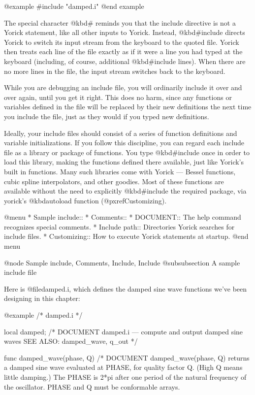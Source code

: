 {@example
#include "damped.i"
@end example

The special character @kbd{#} reminds you that the include directive
is not a Yorick statement, like all other inputs to Yorick.  Instead,
@kbd{#include} directs Yorick to switch its input stream from the
keyboard to the quoted file.  Yorick then treats each line of the file
exactly as if it were a line you had typed at the keyboard (including,
of course, additional @kbd{#include} lines).  When there are no more
lines in the file, the input stream switches back to the keyboard.

While you are debugging an include file, you will ordinarily include
it over and over again, until you get it right.  This does no harm,
since any functions or variables defined in the file will be replaced
by their new definitions the next time you include the file, just as
they would if you typed new definitions.

Ideally, your include files should consist of a series of function
definitions and variable initializations.  If you follow this
discipline, you can regard each include file as a library or package of
functions.  You type @kbd{#include} once in order to load this
library, making the functions defined there available, just like
Yorick's built in functions.  Many such libraries come with Yorick ---
Bessel functions, cubic spline interpolators, and other goodies.
Most of these functions are available without the need to explicitly
@kbd{#include} the required package, via yorick's @kbd{autoload}
function (@pxref{Customizing}).

@menu
* Sample include::              
* Comments::                    
* DOCUMENT::                    The help command recognizes special comments.
* Include path::                Directories Yorick searches for include files.
* Customizing::                 How to execute Yorick statements at startup.
@end menu

@node Sample include, Comments, Include, Include
@subsubsection A sample include file

Here is @file{damped.i}, which defines the damped sine wave functions
we've been designing in this chapter:

@example
/* damped.i */

local damped;
/* DOCUMENT damped.i --- compute and output damped sine waves
   SEE ALSO: damped_wave, q_out
 */

func damped_wave(phase, Q)
/* DOCUMENT damped_wave(phase, Q)
     returns a damped sine wave evaluated at PHASE, for quality factor Q.
     (High Q means little damping.)  The PHASE is 2*pi after one period of
     the natural frequency of the oscillator.  PHASE and Q must be
     conformable arrays.

}
